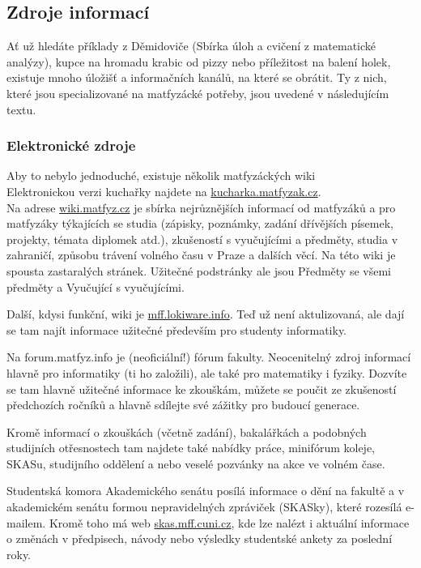 \subsection{Zdroje informací}
Ať už hledáte příklady z Děmidoviče (Sbírka úloh a cvičení z matematické
analýzy), kupce na hromadu krabic od pizzy nebo příležitost na balení holek,
existuje mnoho úložišť a informačních kanálů, na které se obrátit. Ty z nich,
které jsou specializované na matfyzácké potřeby, jsou uvedené v následujícím
textu.


\subsubsection{Elektronické zdroje}
Aby to nebylo jednoduché, existuje několik matfyzáckých wiki\\
Elektronickou verzi kuchařky najdete na \url{kucharka.matfyzak.cz}.\\
Na adrese \url{wiki.matfyz.cz} je sbírka nejrůznějších informací od matfyzáků a
pro matfyzáky týkajících se studia (zápisky, poznámky, zadání dřívějších
písemek, projekty, témata diplomek atd.), zkušeností s vyučujícími a předměty,
studia v zahraničí, způsobu trávení volného času v Praze a dalších věcí. Na této
wiki je spousta zastaralých stránek. Užitečné podstránky ale jsou Předměty se
všemi předměty a Vyučující s vyučujícími.

Další, kdysi funkční, wiki je \url{mff.lokiware.info}. Teď už není aktulizovaná,
ale dají se tam najít informace užitečné především pro studenty informatiky.


Na forum.matfyz.info je (neoficiální!) fórum fakulty. Neocenitelný zdroj
informací hlavně pro informatiky (ti ho založili), ale také pro matematiky i
fyziky. Dozvíte se tam hlavně užitečné informace ke zkouškám, můžete se poučit
ze zkušeností předchozích ročníků a hlavně sdílejte své zážitky pro budoucí
generace.

Kromě informací o zkouškách (včetně zadání), bakalářkách a podobných studijních
otřesnostech tam najdete také nabídky práce, minifórum koleje, SKASu, studijního
oddělení a nebo veselé pozvánky na akce ve volném čase.


Studentská komora Akademického senátu posílá informace o dění na fakultě a v
akademickém senátu formou nepravidelných zpráviček (SKASky), které rozesílá
e-mailem. Kromě toho má web \url{skas.mff.cuni.cz}, kde lze nalézt i aktuální
informace o změnách v předpisech, návody nebo výsledky studentské ankety za
poslední roky.


